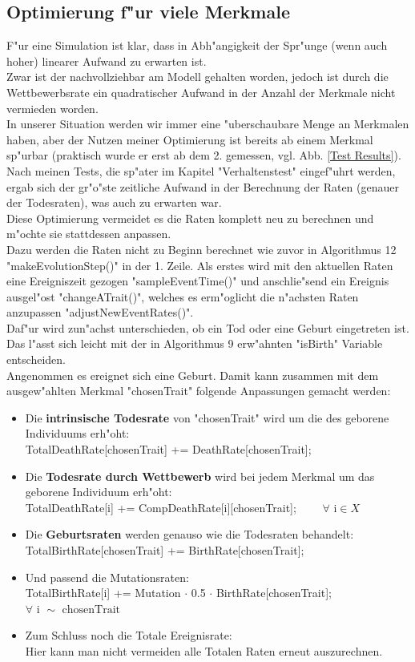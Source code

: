 \documentclass[11pt, a4paper, german]{article}
\theoremstyle{plain}
\begin{document}
	\subsection{Optimierung f"ur viele Merkmale}
	F"ur eine Simulation ist klar, dass in Abh"angigkeit der Spr"unge (wenn auch hoher) linearer Aufwand zu erwarten ist.\\
	Zwar ist der nachvollziehbar am Modell gehalten worden, jedoch ist durch die Wettbewerbsrate ein quadratischer Aufwand in der Anzahl der Merkmale nicht vermieden worden.\\
	In unserer Situation werden wir immer eine "uberschaubare Menge an Merkmalen haben, aber der Nutzen meiner Optimierung ist bereits ab einem Merkmal sp"urbar (praktisch wurde er erst ab dem 2. gemessen, vgl. Abb. \ref{Test Results}).\\
	Nach meinen Tests, die sp"ater im Kapitel "{}Verhaltenstest"{} eingef"uhrt werden, ergab sich der gr"o"ste zeitliche Aufwand in der Berechnung der Raten (genauer der Todesraten), was auch zu erwarten war.\\
	Diese Optimierung vermeidet es die Raten komplett neu zu berechnen und m"ochte sie stattdessen anpassen. \\
	Dazu werden die Raten nicht zu Beginn berechnet wie zuvor in Algorithmus 12 "{}makeEvolutionStep()"{} in der 1. Zeile. Als erstes wird mit den aktuellen Raten eine Ereigniszeit gezogen "{}sampleEventTime()"{} und anschlie"send ein Ereignis ausgel"ost "{}changeATrait()"{}, welches es erm"oglicht die n"achsten Raten anzupassen "{}adjustNewEventRates()"{}.\\
	Daf"ur wird zun"achst unterschieden, ob ein Tod oder eine Geburt eingetreten ist. Das l"asst sich leicht mit der in Algorithmus 9 erw"ahnten "{}isBirth"{} Variable entscheiden.\\
	Angenommen es ereignet sich eine Geburt. Damit kann zusammen mit dem ausgew"ahlten Merkmal "{}chosenTrait"{} folgende Anpassungen gemacht werden:
	\begin{itemize}
		\item Die \textbf{intrinsische Todesrate} von "{}chosenTrait"{} wird um  die des geborene Individuums erh"oht:\\ 
		TotalDeathRate[chosenTrait] += DeathRate[chosenTrait];
		\item Die \textbf{Todesrate durch Wettbewerb} wird bei jedem Merkmal um das geborene Individuum erh"oht:\\
		TotalDeathRate[i] += CompDeathRate[i][chosenTrait]; $ \qquad \forall \text{ i} \in X $
		\item Die \textbf{Geburtsraten} werden genauso wie die Todesraten behandelt:\\
		TotalBirthRate[chosenTrait] += BirthRate[chosenTrait];
		\item Und passend die Mutationsraten:\\
		TotalBirthRate[i] += Mutation $ \cdot $ 0.5 $ \cdot $ BirthRate[chosenTrait]; \\
		$\forall \text{ i } \sim \text{ chosenTrait} $
		\item Zum Schluss noch die Totale Ereignisrate:\\
		Hier kann man nicht vermeiden alle Totalen Raten erneut auszurechnen.
	\end{itemize}
\end{document}
